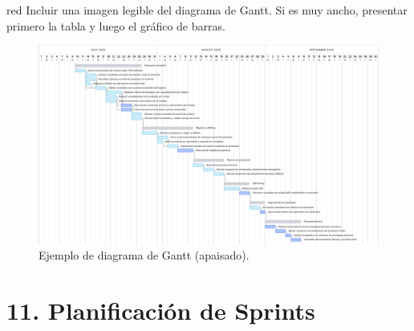 \documentclass[
11pt, %
]{charter}
\begin{document}
\begin{consigna}{red}
Incluir una imagen legible del diagrama de Gantt. Si es muy ancho, presentar primero la tabla y luego el gráfico de barras.

\begin{landscape}
\begin{figure}[htpb]
\centering 
\includegraphics[height=.85\textheight]{./Figuras/Gantt-2.png}
\caption{Ejemplo de diagrama de Gantt (apaisado).} %
\label{fig:diagGantt}
\end{figure}

\end{landscape}

\end{consigna} %


\section{11. Planificación de Sprints}
\end{document}
